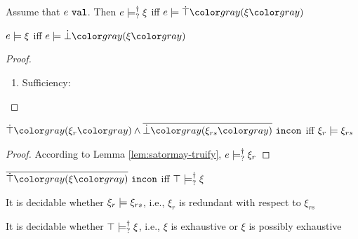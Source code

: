 \begin{lem}
  \label{lem:val-satisfy-truify}
  Assume that $e ~\mathtt{val}$. Then $e \models_{?}^{\dag} \xi$ iff $\csatisfy{e}{\ctruify{\xi}}$
\end{lem}

\begin{lem}
  \label{lem:satisfy-falsify}
  $e \models \xi$ iff $\csatisfy{e}{\cfalsify{\xi}}$
\end{lem}
\begin{proof}
  \begin{enumerate}
    \item Sufficiency:
  \end{enumerate}
\end{proof}

\begin{thm}
  \label{lem:inconsistency-and-redundancy}
  $\cincon{\cand{\ctruify{\xi_r}}{\cdual{\cfalsify{\xi_{rs}}}}}$ iff $\xi_r \models \xi_{rs}$
\end{thm}
\begin{proof}
  According to Lemma \ref{lem:satormay-truify}, $e \models_{?}^{\dag} \xi_r$
\end{proof}

\begin{thm}
  \label{lem:inconsistency-and-exhaustiveness}
  $\cincon{\cdual{\ctruify{\xi}}}$ iff $\top \models_{?}^{\dag} \xi$
\end{thm}

\begin{thm}
  \label{lem:redundancy-decidability}
  It is decidable whether $\xi_r \models \xi_{rs}$, i.e., $\xi_r$ is redundant with respect to $\xi_{rs}$
\end{thm}

\begin{thm}
  \label{lem:exhaustiveness-decidability}
  It is decidable whether $\top \models_{?}^{\dag} \xi$, i.e., $\xi$ is exhaustive or $\xi$ is possibly exhaustive
\end{thm}

